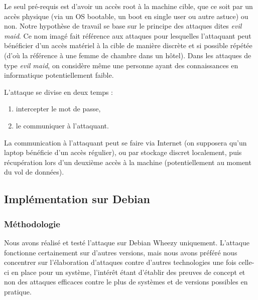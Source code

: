\documentclass[12pt,a4paper]{article}
\begin{document}
Le seul pré-requis est d'avoir un accès root à la machine cible, que ce soit
par un accès physique (via un OS bootable, un boot en single user ou autre
astuce) ou non. Notre hypothèse de travail se base sur le principe des attaques
dites \textit{evil maid}. Ce nom imagé fait référence aux attaques pour
lesquelles l'attaquant peut bénéficier d'un accès matériel à la cible de
manière discrète et si possible répétée (d'où la référence à une femme de
chambre dans un hôtel). Dans les attaques de type \textit{evil maid}, on
considère même une personne ayant des connaissances en informatique
potentiellement faible.

L'attaque se divise en deux temps :
\begin{enumerate}
    \item intercepter le mot de passe,
    \item le communiquer à l'attaquant.
\end{enumerate}

La communication à l'attaquant peut se faire via Internet (on supposera qu'un
laptop bénéficie d'un accès régulier), ou par stockage discret
localement, puis récupération lors d'un deuxième accès à la machine
(potentiellement au moment du vol de données).

\subsection{Implémentation sur Debian}
\subsubsection*{Méthodologie}

Nous avons réalisé et testé l'attaque sur Debian Wheezy uniquement. L'attaque
fonctionne certainement sur d'autres versions, mais nous avons préféré nous
concentrer sur l'élaboration d'attaques contre d'autres technologies une fois
celle-ci en place pour un système, l'intérêt étant d'établir des preuves de 
concept et non des attaques efficaces contre le plus de systèmes et de versions
possibles en pratique.
\end{document}
